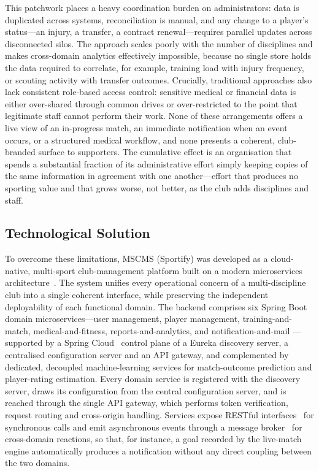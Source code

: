 This patchwork places a heavy coordination burden on administrators: data is duplicated
across systems, reconciliation is manual, and any change to a player's status---an injury,
a transfer, a contract renewal---requires parallel updates across disconnected silos. The
approach scales poorly with the number of disciplines and makes cross-domain analytics
effectively impossible, because no single store holds the data required to correlate, for
example, training load with injury frequency, or scouting activity with transfer outcomes.
Crucially, traditional approaches also lack consistent role-based access control: sensitive
medical or financial data is either over-shared through common drives or over-restricted to
the point that legitimate staff cannot perform their work. None of these arrangements offers
a live view of an in-progress match, an immediate notification when an event occurs, or a
structured medical workflow, and none presents a coherent, club-branded surface to
supporters. The cumulative effect is an organisation that spends a substantial fraction of its
administrative effort simply keeping copies of the same information in agreement with one
another---effort that produces no sporting value and that grows worse, not better, as the
club adds disciplines and staff.

\subsection{Technological Solution}
\label{subsec:technological}

To overcome these limitations, MSCMS (Sportify) was developed as a cloud-native,
multi-sport club-management platform built on a modern microservices
architecture~\cite{microservices}. The system unifies every operational concern of a
multi-discipline club into a single coherent interface, while preserving the independent
deployability of each functional domain. The backend comprises six Spring
Boot~\cite{springboot} domain microservices---user management, player management,
training-and-match, medical-and-fitness, reports-and-analytics, and notification-and-mail
---supported by a Spring Cloud~\cite{springcloud} control plane of a Eureka discovery
server, a centralised configuration server and an API gateway, and complemented by
dedicated, decoupled machine-learning services for match-outcome prediction and
player-rating estimation. Every domain service is registered with the discovery server, draws
its configuration from the central configuration server, and is reached through the single API
gateway, which performs token verification, request routing and cross-origin handling.
Services expose RESTful interfaces~\cite{restapi} for synchronous calls and emit
asynchronous events through a message broker~\cite{kafka} for cross-domain reactions, so
that, for instance, a goal recorded by the live-match engine automatically produces a
notification without any direct coupling between the two domains.


